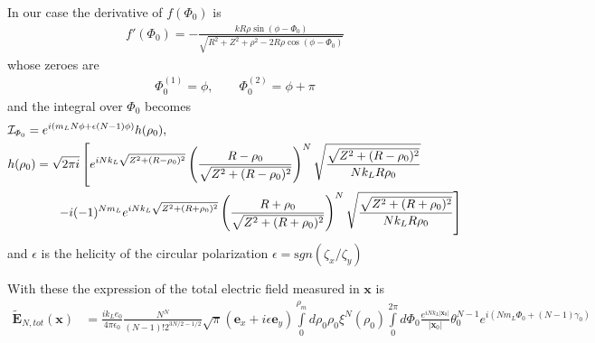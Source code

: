 In our case the derivative of  $f(\varPhi_0)$ is
\begin{align}
    f'(\varPhi_0)=-\frac{k R \rho \sin(\phi-\varPhi_0)}{\sqrt{R^2+Z^2+\rho^2-2 R \rho \cos(\phi-\varPhi_0)}}
\end{align}
whose zeroes are
\begin{align}
    \Phi_0^{(1)} = \phi,\qquad \Phi^{(2)}_0=\phi+\pi
\end{align}
and the integral over $\varPhi_0$ becomes
\begin{align}
     & {\cal I}_{\varPhi_0}=e^{i(m_LN\phi+\epsilon(N-1)\phi)}h(\rho_0),\nonumber                                                                                                              \\
     & h(\rho_0)=\sqrt{2\pi i}\left[e^{iNk_L\sqrt{Z^2+(R-\rho_0)^2}}\left(\frac{R-\rho_0}{\sqrt{Z^2+(R-\rho_0)^2}}\right)^N\sqrt{\frac{\sqrt{Z^2+(R-\rho_0)^2}}{Nk_LR\rho_0}}\right.\nonumber \\
     & \qquad\qquad\left.-i(-1)^{Nm_L}e^{iNk_L\sqrt{Z^2+(R+\rho_0)^2}}\left(\frac{R+\rho_0}{\sqrt{Z^2+(R+\rho_0)^2}}\right)^N\sqrt{\frac{\sqrt{Z^2+(R+\rho_0)^2}}{Nk_LR\rho_0}}\right]
\end{align}
and $\epsilon$ is the helicity of the circular polarization $\epsilon={\mathrm sgn}(\zeta_x/\zeta_y)$

With these the expression of the total  electric field measured in ${\bm x}$ is
\begin{align}
    \tilde {\bm E}_{N,tot}({\bm x}) & =\frac{i k_L  e_0}{4\pi\epsilon_0}\frac{N^N}{(N-1)!2^{3N/2-1/2}}\sqrt{\pi}({\bm e}_x+i \epsilon{\bm e}_y)\int\limits_0^{\rho_m}d\rho_0\rho_0\xi^N(\rho_0)\int\limits_0^{2\pi}d\varPhi_0  \frac{e^{iNk_L|{\bm x}_0|}}{|{\bm x}_0|}\theta_0^{N-1}e^{i(Nm_L\varPhi_0+(N-1)\gamma_0)}\nonumber
\end{align}

